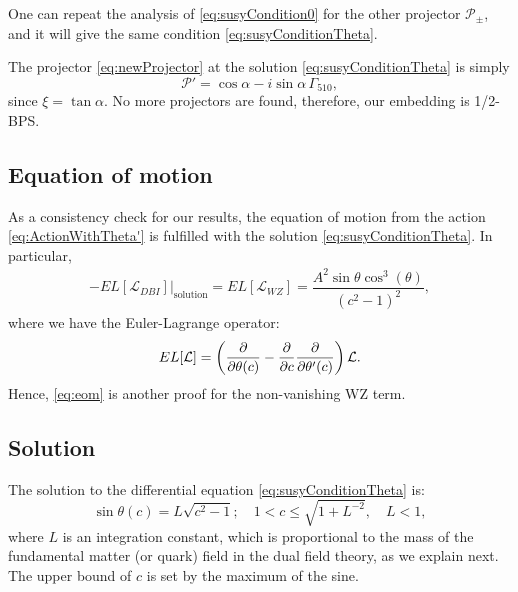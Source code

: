One can repeat the analysis of \eqref{eq:susyCondition0} for the other projector $\mathcal{P}_{\pm}$, and it will give the same condition \eqref{eq:susyConditionTheta}.


The projector \eqref{eq:newProjector} at the solution \eqref{eq:susyConditionTheta} is simply
\begin{equation}
\mathcal{P}' = \cos \alpha - i \sin \alpha \, \Gamma_{510},
\end{equation}
since $ \xi =  \tan \alpha $.
No more projectors are found, therefore, our embedding is 1/2-BPS.


\subsection{Equation of motion}

As a consistency check for our results, the equation of motion from the action \eqref{eq:ActionWithTheta'} is fulfilled with the solution \eqref{eq:susyConditionTheta}. In particular, 
\begin{align}\label{eq:eom}
-\left.EL[\mathcal{L}_{DBI}]\right|_\text{solution} = EL[\mathcal{L}_{WZ}] = \dfrac{A^2 \sin\theta \cos^3(\theta)}{\left(c^2-1\right)^2},
\end{align}
where we have the Euler-Lagrange operator:
\begin{equation}
 EL[\mathcal{L}] = 
 \left(\dfrac{\partial }{\partial \theta(c)} -\dfrac{\partial }{\partial c}  \dfrac{\partial }{\partial \theta'(c)} \right) \mathcal{L}.
\end{equation}
Hence, \eqref{eq:eom} is another proof for the non-vanishing WZ term.




\subsection{Solution}

The solution to the differential equation \eqref{eq:susyConditionTheta} is:
\begin{equation}\label{eq:susyConditionSolution}
\boxed{\sin\theta(c) = L \sqrt{c^2-1}; \quad 1 < c \leq \sqrt{1+L^{-2}}, \quad L < 1},
\end{equation}
where $L$ is an integration constant, which is proportional to the mass of the fundamental matter (or quark) field in the dual field theory, as we explain next. The upper bound of $c$ is set by the maximum of the sine.

